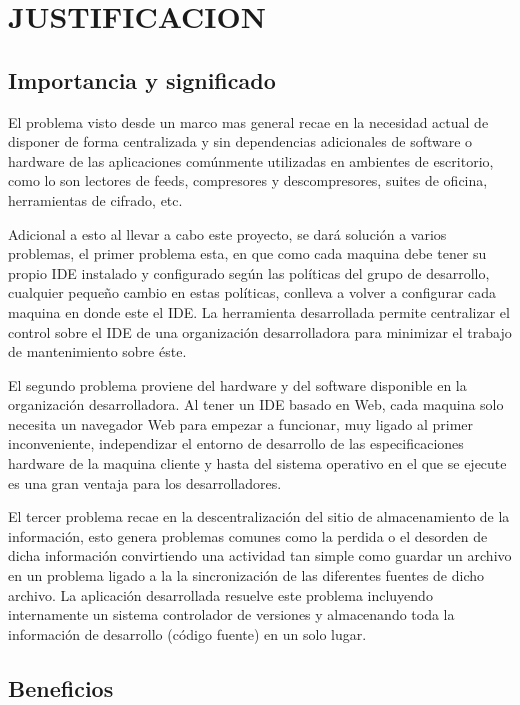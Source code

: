 ﻿\section{JUSTIFICACION}


\subsection{Importancia y significado}

El problema visto desde un marco mas general recae en la necesidad actual de disponer de forma centralizada y sin dependencias adicionales de software o hardware de las aplicaciones comúnmente utilizadas en ambientes de escritorio, como lo son lectores de feeds, compresores y descompresores, suites de oficina, herramientas de cifrado, etc.

Adicional a esto al llevar a cabo este proyecto, se dará solución a varios problemas, el primer problema esta, en que como cada maquina debe tener su propio IDE instalado y configurado según las políticas del grupo de desarrollo, cualquier pequeño cambio en estas políticas, conlleva a volver a configurar cada maquina en donde este el IDE. La herramienta desarrollada permite centralizar el control sobre el IDE de una organización desarrolladora para minimizar el trabajo de mantenimiento sobre éste.

El segundo problema proviene del hardware y del software disponible en la organización desarrolladora. Al tener un IDE basado en Web, cada maquina solo necesita un navegador Web para empezar a funcionar, muy ligado al primer inconveniente, independizar el entorno de desarrollo de las especificaciones hardware de la maquina cliente y hasta del sistema operativo en el que se ejecute es una gran ventaja para los desarrolladores.

El tercer problema recae en la descentralización del sitio de almacenamiento de la información, esto genera problemas comunes como la perdida o el desorden de dicha información convirtiendo una actividad tan simple como guardar un archivo en un problema ligado a la la sincronización de las diferentes fuentes de dicho archivo. La aplicación desarrollada resuelve este problema incluyendo internamente un sistema controlador de versiones y almacenando toda la información de desarrollo (código fuente) en un solo lugar.


\subsection{Beneficios}

